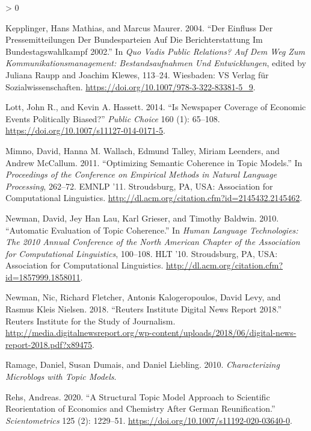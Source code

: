 \documentclass[
]{article}
\newlength{\cslhangindent}
\newenvironment{CSLReferences}[2] %
 {%
  \setlength{\parindent}{0pt}
  \ifodd #1 \everypar{\setlength{\hangindent}{\cslhangindent}}\ignorespaces\fi
  \ifnum #2 > 0
  \setlength{\parskip}{#2\baselineskip}
  \fi
 }%
 {}
\begin{document}
\begin{CSLReferences}{1}{0}
\leavevmode\hypertarget{ref-kepplinger_einfluss_2004}{}%
Kepplinger, Hans Mathias, and Marcus Maurer. 2004. {``Der Einfluss Der
Pressemitteilungen Der Bundesparteien Auf Die Berichterstattung Im
Bundestagswahlkampf 2002.''} In \emph{Quo Vadis Public Relations? Auf
Dem Weg Zum Kommunikationsmanagement: Bestandsaufnahmen Und
Entwicklungen}, edited by Juliana Raupp and Joachim Klewes, 113--24.
Wiesbaden: {VS} Verlag für Sozialwissenschaften.
\url{https://doi.org/10.1007/978-3-322-83381-5_9}.

\leavevmode\hypertarget{ref-lott_is_2014}{}%
Lott, John R., and Kevin A. Hassett. 2014. {``Is Newspaper Coverage of
Economic Events Politically Biased?''} \emph{Public Choice} 160 (1):
65--108. \url{https://doi.org/10.1007/s11127-014-0171-5}.

\leavevmode\hypertarget{ref-mimno_optimizing_2011}{}%
Mimno, David, Hanna M. Wallach, Edmund Talley, Miriam Leenders, and
Andrew McCallum. 2011. {``Optimizing Semantic Coherence in Topic
Models.''} In \emph{Proceedings of the Conference on Empirical Methods
in Natural Language Processing}, 262--72. {EMNLP} '11. Stroudsburg,
{PA}, {USA}: Association for Computational Linguistics.
\url{http://dl.acm.org/citation.cfm?id=2145432.2145462}.

\leavevmode\hypertarget{ref-newman_automatic_2010}{}%
Newman, David, Jey Han Lau, Karl Grieser, and Timothy Baldwin. 2010.
{``Automatic Evaluation of Topic Coherence.''} In \emph{Human Language
Technologies: The 2010 Annual Conference of the North American Chapter
of the Association for Computational Linguistics}, 100--108. {HLT} '10.
Stroudsburg, {PA}, {USA}: Association for Computational Linguistics.
\url{http://dl.acm.org/citation.cfm?id=1857999.1858011}.

\leavevmode\hypertarget{ref-newman_reuters_2018}{}%
Newman, Nic, Richard Fletcher, Antonis Kalogeropoulos, David Levy, and
Rasmus Kleis Nielsen. 2018. {``Reuters Institute Digital News Report
2018.''} Reuters Institute for the Study of Journalism.
\url{http://media.digitalnewsreport.org/wp-content/uploads/2018/06/digital-news-report-2018.pdf?x89475}.

\leavevmode\hypertarget{ref-ramage_characterizing_2010}{}%
Ramage, Daniel, Susan Dumais, and Daniel Liebling. 2010.
\emph{Characterizing Microblogs with Topic Models}.

\leavevmode\hypertarget{ref-rehs_structural_2020}{}%
Rehs, Andreas. 2020. {``A Structural Topic Model Approach to Scientific
Reorientation of Economics and Chemistry After German Reunification.''}
\emph{Scientometrics} 125 (2): 1229--51.
\url{https://doi.org/10.1007/s11192-020-03640-0}.


\end{CSLReferences}
\end{document}

